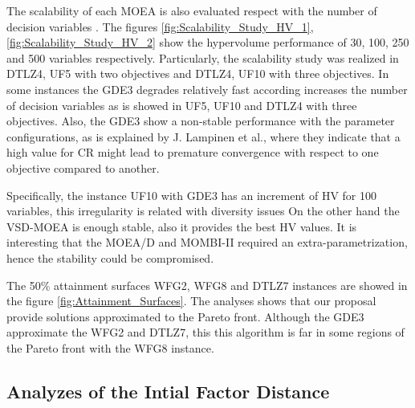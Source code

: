 The scalability of each MOEA is also evaluated respect with the number of decision variables \cite{Joel:ScalabilityStudy}. 
%
The figures \ref{fig:Scalability_Study_HV_1}, \ref{fig:Scalability_Study_HV_2} show the hypervolume performance of 30, 100, 250 and 500 variables respectively.
%
Particularly,  the scalability study was realized in DTLZ4, UF5 with two objectives and DTLZ4, UF10 with three objectives.
%
In some instances the GDE3 degrades relatively fast according increases the number of decision variables as is showed in UF5, UF10 and DTLZ4 with three objectives.
%
Also, the GDE3 show a non-stable performance with the parameter configurations, as is explained by J. Lampinen et al.\cite{Joel:GDE3_CEC09}, where they indicate that a high value for CR might lead to premature convergence with respect to one objective compared to another.

%
Specifically, the instance UF10 with GDE3 has an increment of HV for 100 variables, this irregularity is related with diversity issues \cite{Joel:GDE3_CEC09}
%
On the other hand the VSD-MOEA is enough stable, also it provides the best HV values.
%
It is interesting that the MOEA/D and MOMBI-II required an extra-parametrization, hence the stability could be compromised.

%
The 50\% attainment surfaces WFG2, WFG8 and DTLZ7 instances are showed in the figure \ref{fig:Attainment_Surfaces}.
%
The analyses shows that our proposal provide solutions approximated to the Pareto front.
%
Although the GDE3 approximate the WFG2 and DTLZ7, this this algorithm is far in some regions of the Pareto front with the WFG8 instance. 

\begin{figure}[t]
\centering

\label{fig:variable-decision-scalability-2obj}
\end{figure}


\begin{figure}[t]
\centering

\label{fig:variable-decision-scalability-3obj}
\end{figure}

\subsection{Analyzes of the Intial Factor Distance}

\begin{figure}[t]
\centering

\label{fig:Initial-distance-factor}
\end{figure}

